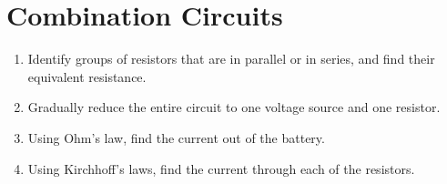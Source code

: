 \section{Combination Circuits}

\begin{enumerate}
\item Identify groups of resistors that are in parallel or in series, and
  find their equivalent resistance.
\item Gradually reduce the entire circuit to one voltage source and one
  resistor.
\item Using Ohm's law, find the current out of the battery.
\item Using Kirchhoff's laws, find the current through each of the resistors.
\end{enumerate}


